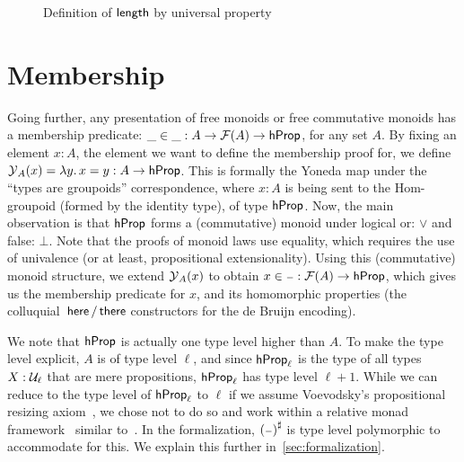 \begin{figure}[H]
    \centering
    \caption{Definition of $\operatorname{\mathsf{length}}$ by universal property}
\end{figure}

\section{Membership}\label{comb:member}

Going further, any presentation of free monoids or free commutative monoids has a membership predicate:
$\_\in\_ : A \to \mathcal{F}(A) \to \mathsf{hProp}$, for any set $A$.
%
By fixing an element $x: A$, the element we want to define the membership proof for,
we define $\yo_A(x) = \lambda y.\, x \id y : A \to \hProp$.
%
This is formally the Yoneda map under the ``types are groupoids'' correspondence,
where $x:A$ is being sent to the Hom-groupoid (formed by the identity type), of type $\mathsf{hProp}$.
%
Now, the main observation is that $\mathsf{hProp}$ forms a (commutative) monoid under logical or: $\vee$ and false: $\bot$.
%
Note that the proofs of monoid laws use equality, which requires the use of univalence (or at least, propositional
extensionality).
%
Using this (commutative) monoid structure, we extend $\text{$\mathcal{Y}$}_A(x)$ to obtain $x \in {\scriptstyle{-}} : \mathcal{F}(A) \to \mathsf{hProp}$, which
gives us the membership predicate for $x$, and its homomorphic properties (the colluquial~$\operatorname{\mathsf{here}}/\operatorname{\mathsf{there}}$
constructors for the de Bruijn encoding).

We note that $\mathsf{hProp}$ is actually one type level higher than $A$.
To make the type level explicit, $A$ is of type level $\ell$, and since $\mathsf{hProp}_\ell$
is the type of all types $X : \mathcal{U}_\ell$ that are mere propositions, $\mathsf{hProp}_\ell$ has
type level $\ell + 1$. While we can reduce to the type level of $\mathsf{hProp}_\ell$ to $\ell$ if
we assume Voevodsky's propositional resizing axiom~\cite{voevodskyResizingRulesTheir2011},
we chose not to do so and work within a relative monad framework~\cite{arkor_formal_2023}
similar to~\cite[Section~3]{choudhuryFreeCommutativeMonoids2023}. In the formalization,
${({\scriptstyle{-}})}^{\sharp}$ is type level polymorphic to accommodate for this. We explain this
further in~\cref{sec:formalization}.

